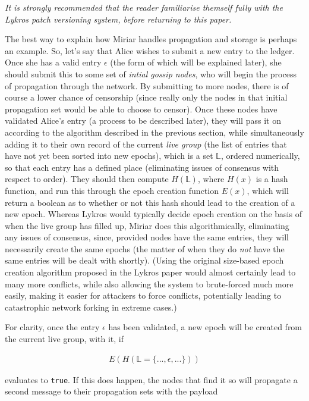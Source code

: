 \documentclass{extreport}
\begin{document}
\emph{It is strongly recommended that the reader familiarise themself fully with the Lykros patch versioning system, before returning to this paper.}

The best way to explain how Miriar handles propagation and storage is perhaps an example. So, let's say that Alice wishes to submit a new entry to the ledger. Once she has a valid entry \(\epsilon\) (the form of which will be explained later), she should submit this to some set of \emph{intial gossip nodes}, who will begin the process of propagation through the network. By submitting to more nodes, there is of course a lower chance of censorship (since really only the nodes in that initial propagation set would be able to choose to censor). Once these nodes have validated Alice's entry (a process to be described later), they will pass it on according to the algorithm described in the previous section, while simultaneously adding it to their own record of the current \emph{live group} (the list of entries that have not yet been sorted into new epochs), which is a set \(\mathbb{L}\), ordered numerically, so that each entry has a defined place (eliminating issues of consensus with respect to order). They should then compute \(H(\mathbb{L})\), where \(H(x)\) is a hash function, and run this through the epoch creation function \(E(x)\), which will return a boolean as to whether or not this hash should lead to the creation of a new epoch. Whereas Lykros would typically decide epoch creation on the basis of when the live group has filled up, Miriar does this algorithmically, eliminating any issues of consensus, since, provided nodes have the same entries, they will necessarily create the same epochs (the matter of when they do \emph{not} have the same entries will be dealt with shortly). (Using the original size-based epoch creation algorithm proposed in the Lykros paper would almost certainly lead to many more conflicts, while also allowing the system to brute-forced much more easily, making it easier for attackers to force conflicts, potentially leading to catastrophic network forking in extreme cases.)

For clarity, once the entry \(\epsilon\) has been validated, a new epoch will be created from the current live group, with it, if

\begin{align*}
E( H( \mathbb{L} = \{ ..., \epsilon, ... \} ) ) \tag{3.1}
\end{align*}

evaluates to \texttt{true}. If this does happen, the nodes that find it so will propagate a second message to their propagation sets with the payload
\end{document}
